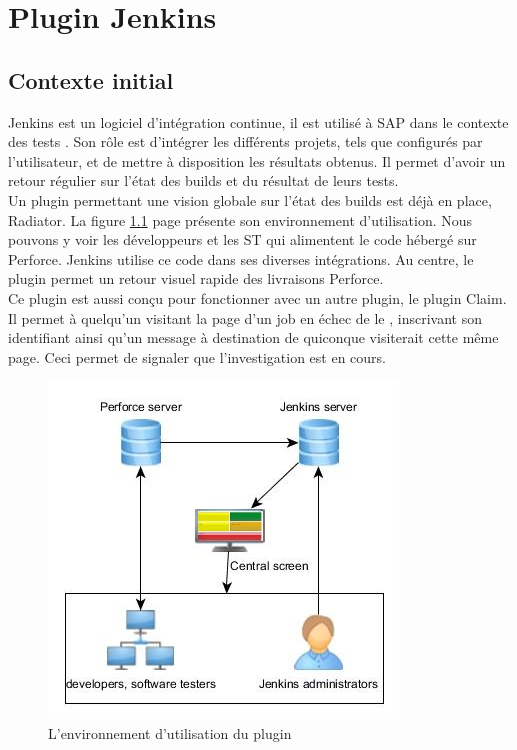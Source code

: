 \chapter{Plugin Jenkins}

\section{Contexte initial}

Jenkins est un logiciel d'intégration continue, il est utilisé à SAP dans le contexte des tests . Son rôle est d'intégrer les différents projets, tels que configurés par l'utilisateur, et de mettre à disposition les résultats obtenus. Il permet d'avoir un retour régulier sur l'état des builds et du résultat de leurs tests.\\

Un plugin permettant une vision globale sur l'état des builds est déjà en place, Radiator. La figure \ref{figure:reportingPluginEnvironmentAfter} page \pageref{figure:reportingPluginEnvironmentAfter} présente son environnement d'utilisation. Nous pouvons y voir les développeurs et les ST qui alimentent le code hébergé sur Perforce. Jenkins utilise ce code dans ses diverses intégrations. Au centre, le plugin permet un retour visuel rapide des livraisons Perforce.\\
Ce plugin est aussi conçu pour fonctionner avec un autre plugin, le plugin Claim. Il permet à quelqu'un visitant la page d'un job en échec de le , inscrivant son identifiant ainsi qu'un message à destination de quiconque visiterait cette même page. Ceci permet de signaler que l'investigation est en cours.\\

\begin{figure}[!h]
  \centering
      \includegraphics{images/reportingPluginEnvironmentAfter.jpg}
  \caption{L'environnement d'utilisation du plugin}
	\label{figure:reportingPluginEnvironmentAfter}
\end{figure}

